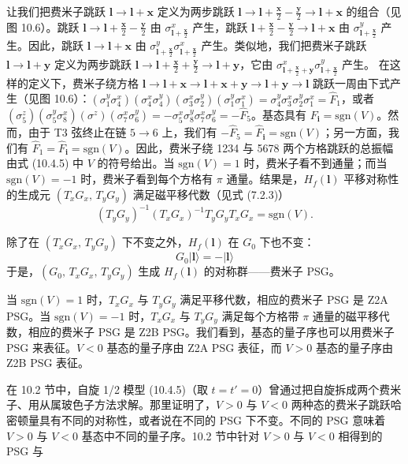 让我们把费米子跳跃 $\pmb{l}\to\pmb{l}+\pmb{x}$ 定义为两步跳跃 $\pmb{l}\to\pmb{l}+\frac{\pmb{x}}{2}-\frac{\pmb{y}}{2}\to\pmb{l}+\pmb{x}$ 的组合（见图 10.6）。跳跃 $\pmb{l}\to\pmb{l}+\frac{\pmb{x}}{2}-\frac{\pmb{y}}{2}$ 由 $\sigma_{\pmb{l}+\frac{\pmb{x}}{2}}^{x}$ 产生，跳跃 $\pmb{l}+\frac{\pmb{x}}{2}-\frac{\pmb{y}}{2}\to\pmb{l}+\pmb{x}$ 由 $\sigma_{\pmb{l}+\frac{\pmb{x}}{2}}^{y}$ 产生。因此，跳跃 $\pmb{l}\to\pmb{l}+\pmb{x}$ 由 $\sigma_{\pmb{l}+\frac{\pmb{x}}{2}}^{y}\sigma_{\pmb{l}+\frac{\pmb{x}}{2}}^{x}$ 产生。类似地，我们把费米子跳跃 $\pmb{l}\to\pmb{l}+\pmb{y}$ 定义为两步跳跃 $\pmb{l}\to\pmb{l}+\frac{\pmb{x}}{2}+\frac{\pmb{y}}{2}\to\pmb{l}+\pmb{y}$，它由 $\sigma_{\pmb{l}+\frac{\pmb{x}}{2}+\pmb{y}}^{x}\sigma_{\pmb{l}+\frac{\pmb{x}}{2}}^{y}$ 产生。
在这样的定义下，费米子绕方格 $\pmb{l}\to\pmb{l}+\pmb{x}\to\pmb{l}+\pmb{x}+\pmb{y}\to\pmb{l}+\pmb{y}\to\pmb{l}$ 跳跃一周由下式产生（见图 10.6）：$(\sigma_1^{y}\sigma_4^{x})(\sigma_4^{x}\sigma_4^{y})(\sigma_3^{x}\sigma_2^{y})(\sigma_1^{y}\sigma_1^{x})=\sigma_4^{y}\sigma_3^{x}\sigma_2^{y}\sigma_1^{x}=\hat F_1$，或者 $(\sigma_5^{z})(\sigma_5^{y}\sigma_8^{x})(\sigma^{z})(\sigma_7^{x}\sigma_6^{y})=-\sigma_5^{x}\sigma_8^{y}\sigma_7^{x}\sigma_6^{y}=-\hat F_5$。基态具有 $F_{\pmb{i}}=\mathrm{sgn}(V)$。然而，由于 T3 弦终止在链 $5\to6$ 上，我们有 $-\hat F_5=\hat F_{\pmb{i}}=\mathrm{sgn}(V)$；另一方面，我们有 $\hat F_1=\hat F_{\pmb{i}}=\mathrm{sgn}(V)$。因此，费米子绕 1234 与 5678 两个方格跳跃的总振幅由式 (10.4.5) 中 $V$ 的符号给出。当 $\mathrm{sgn}(V)=1$ 时，费米子看不到通量；而当 $\mathrm{sgn}(V)=-1$ 时，费米子看到每个方格有 $\pi$ 通量。结果是，$H_f(\pmb{l})$ 平移对称性的生成元 $(T_xG_x,\,T_yG_y)$ 满足磁平移代数（见式 (7.2.3)）
\begin{equation*}
(T_yG_y)^{-1}(T_xG_x)^{-1}T_yG_yT_xG_x=\mathrm{sgn}(V).\tag{10.4.6}
\end{equation*}

除了在 $(T_xG_x,\,T_yG_y)$ 下不变之外，$H_f(\pmb{l})$ 在 $G_0$ 下也不变：
\begin{equation*}
G_0|\pmb{l}\rangle=-|\pmb{l}\rangle
\end{equation*}
于是，$(G_0,\,T_xG_x,\,T_yG_y)$ 生成 $H_f(\pmb{l})$ 的对称群——费米子 PSG。

当 $\mathrm{sgn}(V)=1$ 时，$T_xG_x$ 与 $T_yG_y$ 满足平移代数，相应的费米子 PSG 是 Z2A PSG。当 $\mathrm{sgn}(V)=-1$ 时，$T_xG_x$ 与 $T_yG_y$ 满足每个方格带 $\pi$ 通量的磁平移代数，相应的费米子 PSG 是 Z2B PSG。我们看到，基态的量子序也可以用费米子 PSG 来表征。$V<0$ 基态的量子序由 Z2A PSG 表征，而 $V>0$ 基态的量子序由 Z2B PSG 表征。

在 10.2 节中，自旋 1/2 模型 (10.4.5)（取 $t=t'=0$）曾通过把自旋拆成两个费米子、用从属玻色子方法求解。那里证明了，$V>0$ 与 $V<0$ 两种态的费米子跳跃哈密顿量具有不同的对称性，或者说在不同的 PSG 下不变。不同的 PSG 意味着 $V>0$ 与 $V<0$ 基态中不同的量子序。10.2 节中针对 $V>0$ 与 $V<0$ 相得到的 PSG 与
